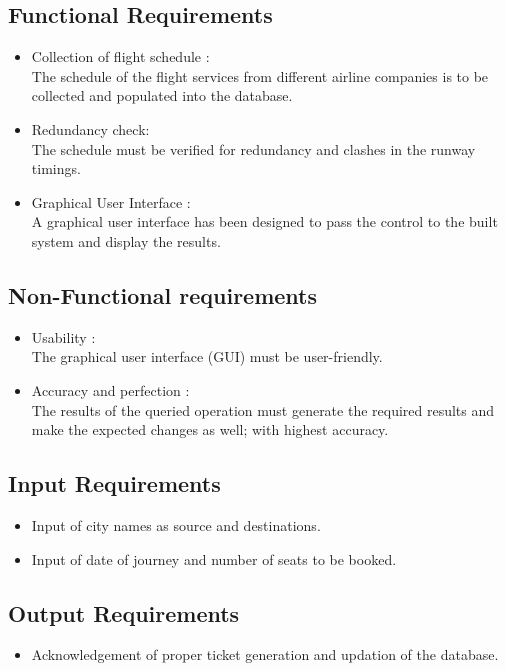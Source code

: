 \documentclass[hidelinks=true]{article}
\begin{document}
\subsection{Functional Requirements}
\begin{itemize}
\item {Collection of flight schedule : \\ \small{ The schedule of the flight services from different airline companies is to be collected and populated into the database.}}

\item {Redundancy check: \\ \small{The schedule must be verified for redundancy and clashes in the runway timings.}}
\item {Graphical User Interface : \\ \small{A graphical user interface has been designed to pass the control to the built system and display the results.}}
\end{itemize}

\subsection{Non-Functional requirements}
\begin{itemize}
\item {Usability :  \\ \small{The graphical user interface (GUI)} must be user-friendly.}
\item {Accuracy and perfection : \\ \small{The results of the queried operation must generate the required results and make the expected changes as well; with highest accuracy.}}
\end{itemize}

\subsection{Input Requirements}
\begin{itemize}
\item Input of city names as source and destinations.
\item Input of date of journey and number of seats to be booked.
\end{itemize}

\subsection{Output Requirements}
\begin{itemize}
\item Acknowledgement of proper ticket generation and updation of the database.
\end{itemize}
\end{document}
